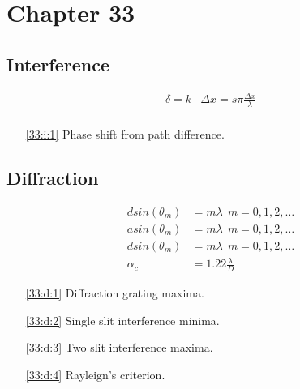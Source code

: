 \documentclass{subfile}
\begin{document}
\section{Chapter 33}
\subsection{Interference}
\begin{align}
  \delta = k&\Delta x=s \pi \frac{\Delta x}{\lambda}\label{33:i:1}\\
\end{align}
\begin{enumerate}
  \item[\eqref{33:i:1}] Phase shift from path difference.
\end{enumerate}
\subsection{Diffraction}
\begin{align}
  dsin(\theta_m) &= m\lambda\ \ m=0,1,2,\hdots \label{33:d:1}\\
  asin(\theta_m) &= m\lambda\ \ m=0,1,2,\hdots \label{33:d:2}\\
  dsin(\theta_m) &= m\lambda\ \ m=0,1,2,\hdots \label{33:d:3}\\
  \alpha_c &= 1.22\frac{\lambda}{D} \label{33:d:4}
\end{align}
\begin{enumerate}
  \item[\eqref{33:d:1}] Diffraction grating maxima.
  \item[\eqref{33:d:2}] Single slit interference minima.
  \item[\eqref{33:d:3}] Two slit interference maxima.
  \item[\eqref{33:d:4}] Rayleign's criterion.
\end{enumerate}
\end{document}
